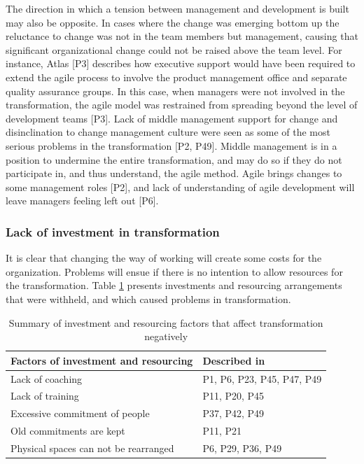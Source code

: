 \documentclass[preprint,authoryear,12pt]{elsarticle}
\begin{document}
The direction in which a tension between management and development is built may
also be opposite. In cases where the change was emerging bottom up the
reluctance to change was not in the team members but management, causing that
significant organizational change could not be raised above the team level. For
instance, Atlas [P3] describes how executive support would have been required to
extend the agile process to involve the product management office and separate
quality assurance groups. In this case, when managers %
were not involved in the transformation, the agile model was restrained from
spreading beyond the level of development teams [P3]. Lack of middle management
support for change and disinclination to change management culture were seen as
some of the most serious problems in the transformation [P2, P49]. Middle
management is in a position to undermine the entire transformation, and may do
so if they do not participate in, and thus understand, the agile method. Agile
brings changes to some management roles [P2], and lack of understanding of agile
development will leave managers feeling left out [P6].


\subsubsection{Lack of investment in transformation}

It is clear that changing the way of working will create some costs for the
organization. Problems will ensue if there is no intention to allow resources
for the transformation. Table \ref{table:challenges_lackofinvestment} presents
investments and resourcing arrangements that were withheld, and which caused
problems in transformation.

\begin{table}[h]
    \centering
    \begin{tabular}{ l l }
        \toprule
        Factors of investment and resourcing  &  Described in \\
        \midrule
        Lack of coaching                      &  P1, P6, P23, P45, P47, P49  \\
        Lack of training                      &  P11, P20, P45  \\
        Excessive commitment of people        &  P37, P42, P49  \\
        Old commitments are kept              &  P11, P21  \\
        Physical spaces can not be rearranged  &  P6, P29, P36, P49  \\
        \bottomrule
    \end{tabular}
    \caption{Summary of investment and resourcing factors that affect
             transformation negatively}
    \label{table:challenges_lackofinvestment}
\end{table}
\end{document}
